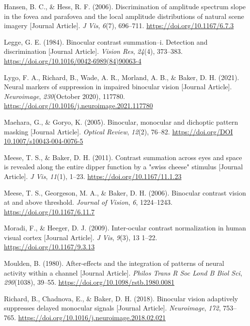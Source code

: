 \documentclass[
  12pt,
]{article}
\newlength{\cslhangindent}
\newenvironment{CSLReferences}[2] %
 {\begin{list}{}{%
  \setlength{\itemindent}{0pt}
  \setlength{\leftmargin}{0pt}
  \setlength{\parsep}{0pt}
  \ifodd #1
   \setlength{\leftmargin}{\cslhangindent}
   \setlength{\itemindent}{-1\cslhangindent}
  \fi
  \setlength{\itemsep}{#2\baselineskip}}}
 {\end{list}}
\begin{document}
\begin{CSLReferences}{1}{0}
Hansen, B. C., \& Hess, R. F. (2006). Discrimination of amplitude
spectrum slope in the fovea and parafovea and the local amplitude
distributions of natural scene imagery {[}Journal Article{]}. \emph{J
Vis}, \emph{6}(7), 696--711. \url{https://doi.org/10.1167/6.7.3}

Legge, G. E. (1984). Binocular contrast summation--i. Detection and
discrimination {[}Journal Article{]}. \emph{Vision Res}, \emph{24}(4),
373--383. \url{https://doi.org/10.1016/0042-6989(84)90063-4}

Lygo, F. A., Richard, B., Wade, A. R., Morland, A. B., \& Baker, D. H.
(2021). Neural markers of suppression in impaired binocular vision
{[}Journal Article{]}. \emph{Neuroimage}, \emph{230}(October 2020),
117780. \url{https://doi.org/10.1016/j.neuroimage.2021.117780}

Maehara, G., \& Goryo, K. (2005). Binocular, monocular and dichoptic
pattern masking {[}Journal Article{]}. \emph{Optical Review},
\emph{12}(2), 76--82.
\href{https://doi.org/DOI\%2010.1007/s10043-004-0076-5}{https://doi.org/DOI
10.1007/s10043-004-0076-5}

Meese, T. S., \& Baker, D. H. (2011). Contrast summation across eyes and
space is revealed along the entire dipper function by a "swiss cheese"
stimulus {[}Journal Article{]}. \emph{J Vis}, \emph{11}(1), 1--23.
\url{https://doi.org/10.1167/11.1.23}

Meese, T. S., Georgeson, M. A., \& Baker, D. H. (2006). Binocular
contrast vision at and above threshold. \emph{Journal of Vision},
\emph{6}, 1224--1243. \url{https://doi.org/10.1167/6.11.7}

Moradi, F., \& Heeger, D. J. (2009). Inter-ocular contrast normalization
in human visual cortex {[}Journal Article{]}. \emph{J Vis}, \emph{9}(3),
13 1--22. \url{https://doi.org/10.1167/9.3.13}

Moulden, B. (1980). After-effects and the integration of patterns of
neural activity within a channel {[}Journal Article{]}. \emph{Philos
Trans R Soc Lond B Biol Sci}, \emph{290}(1038), 39--55.
\url{https://doi.org/10.1098/rstb.1980.0081}

Richard, B., Chadnova, E., \& Baker, D. H. (2018). Binocular vision
adaptively suppresses delayed monocular signals {[}Journal Article{]}.
\emph{Neuroimage}, \emph{172}, 753--765.
\url{https://doi.org/10.1016/j.neuroimage.2018.02.021}


\end{CSLReferences}
\end{document}
